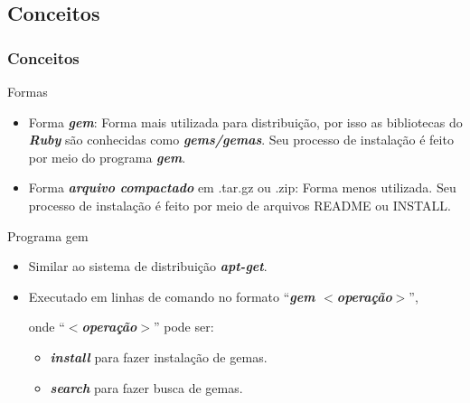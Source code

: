 \subsection{Conceitos}
\begin{frame}
 \frametitle{Conceitos}

  \begin{block}{Formas}

   \begin{itemize}

    \item Forma \emph{\textbf{gem}}: Forma mais utilizada para distribuição, por isso as bibliotecas do
    \emph{\textbf{Ruby}} são conhecidas como \emph{\textbf{gems/gemas}}. Seu processo de instalação
    é feito por meio do programa \emph{\textbf{gem}}.

    \item Forma \emph{\textbf{arquivo compactado}} em .tar.gz ou .zip: Forma menos utilizada. Seu processo
    de instalação é feito por meio de arquivos README ou INSTALL.

   \end{itemize}

  \end{block}

  \begin{block}{Programa gem}

   \begin{itemize}

    \item Similar ao sistema de distribuição \emph{\textbf{apt-get}}.

    \item Executado em linhas de comando no formato ``\emph{\textbf{gem $<$operação$>$}}'',

    onde ``\emph{\textbf{$<$operação$>$}}'' pode ser:

    \begin{itemize}

     \item \emph{\textbf{install}} para fazer instalação de gemas.

     \item \emph{\textbf{search}} para fazer busca de gemas.

    \end{itemize}


   \end{itemize}

  \end{block}

\end{frame}



